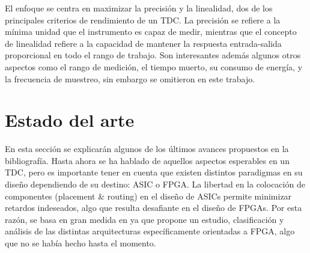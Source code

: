 El enfoque se centra en maximizar la precisión y la linealidad, dos de los principales criterios de rendimiento de un TDC.
La precisión se refiere a la mínima unidad que el instrumento es capaz de medir, mientras que el concepto de linealidad refiere
a la capacidad de mantener la respuesta entrada-salida proporcional en todo el rango de trabajo. 
Son interesantes además algunos
otros aspectos como el rango de medición, el tiempo muerto, su consumo de energía, y la frecuencia de muestreo,
sin embargo se omitieron en este trabajo.\\

\clearpage





\section{Estado del arte}
En esta sección se explicarán algunos de los últimos avances propuestos en la bibliografía. Hasta ahora se ha hablado de
aquellos aspectos esperables en un TDC, pero es importante tener en cuenta que existen distintos paradigmas en su diseño dependiendo
de su destino: ASIC o FPGA. La libertad en la colocación de componentes (placement \& routing) 
en el diseño de ASICs permite minimizar retardos indeseados, algo que resulta desafiante en el diseño de FPGAs. Por esta razón,
se basa en gran medida en \cite{Machado} ya que propone un estudio, clasificación y análisis de las distintas 
arquitecturas específicamente orientadas a FPGA, algo que no se había hecho hasta el momento.\\


